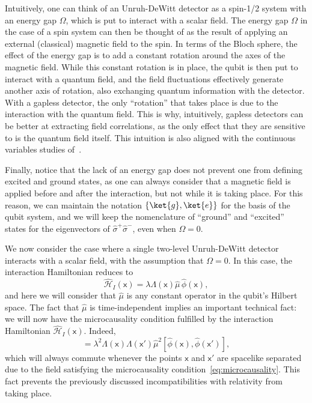 \documentclass[letterpaper,12pt,titlepage,oneside,final]{book}
\newcommand{\mf}{\mathsf}%
\begin{document}
Intuitively, one can think of an Unruh-DeWitt detector as a spin-1/2 system with an energy gap $\Omega$, which is put to interact with a scalar field. The energy gap $\Omega$ in the case of a spin system can then be thought of as the result of applying an external (classical) magnetic field to the spin. In terms of the Bloch sphere, the effect of the energy gap is to add a constant rotation around the axes of the magnetic field. While this constant rotation is in place, the qubit is then put to interact with a quantum field, and the field fluctuations effectively generate another axis of rotation, also exchanging quantum information with the detector. With a gapless detector, the only ``rotation'' that takes place is due to the interaction with the quantum field. This is why, intuitively, gapless detectors can be better at extracting field correlations, as the only effect that they are sensitive to is the quantum field itself. This intuition is also aligned with the continuous variables studies of~\cite{MariaContinuous}.

Finally, notice that the lack of an energy gap does not prevent one from defining excited and ground states, as one can always consider that a magnetic field is applied before and after the interaction, but not while it is taking place. For this reason, we can maintain the notation $\{\ket{g},\ket{e}\}$ for the basis of the qubit system, and we will keep the nomenclature of ``ground'' and ``excited'' states for the eigenvectors of $ \hat{\sigma}^+\hat{\sigma}^-$, even when $\Omega = 0$.

We now consider the case where a single two-level Unruh-DeWitt detector interacts with a scalar field, with the assumption that $\Omega = 0$. In this case, the interaction Hamiltonian reduces to
\begin{equation}
    \hat{\mathcal{H}}_I(\mf x) = \lambda \Lambda(\mf x) \hat{\mu} \,\hat{\phi}(\mf x),
\end{equation}
and here we will consider that $\hat{\mu}$ is any constant operator in the qubit's Hilbert space. The fact that $\hat{\mu}$ is time-independent implies an important technical fact: we will now have the microcausality condition fulfilled by the interaction Hamiltonian $\hat{\mathcal{H}}_I(\mf x)$. Indeed,
\begin{equation}
    [\hat{\mathcal{H}}_I(\mf x), \hat{\mathcal{H}}_I(\mf x')] = \lambda^2 \Lambda(\mf x)\Lambda(\mf x') \hat{\mu}^2[\hat{\phi}(\mf x), \hat{\phi}(\mf x')],
\end{equation}
which will always commute whenever the points $\mf x$ and $\mf x'$ are spacelike separated due to the field satisfying the microcausality condition~\eqref{eq:microcausality}. This fact prevents the previously discussed incompatibilities with relativity from taking place. 
\end{document}
